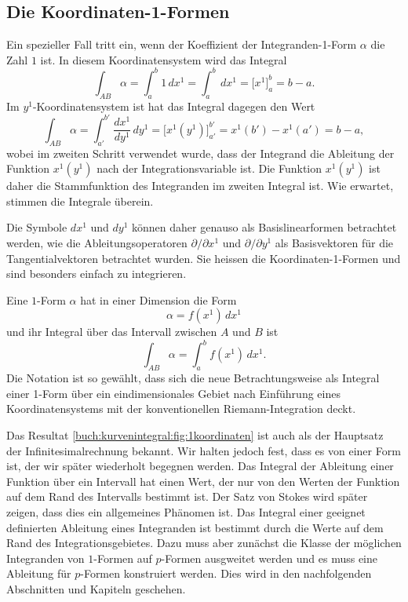 \subsection{Die Koordinaten-1-Formen}
Ein spezieller Fall tritt ein, wenn der Koeffizient der Integranden-1-Form
$\alpha$ die Zahl $1$ ist.
In diesem Koordinatensystem wird das Integral
\[
\int_{AB} \alpha
=
\int_{a}^{b} 1\, dx^1
=
\int_{a}^b\,dx^1
=
\bigl[ x^1 \bigr]_a^b
=
b-a.
\]
Im $y^1$-Koordinatensystem ist hat das Integral dagegen den Wert
\begin{equation}
\int_{AB}\alpha
=
\int_{a'}^{b'} \frac{dx^1}{dy^1}\,dy^1
=
\bigl[x^1(y^1)\bigr]_{a'}^{b'}
=
x^1(b') - x^1(a')
=
b-a,
\label{buch:kurvenintegral:1formen:eqn:hauptsatz}
\end{equation}
wobei im zweiten Schritt verwendet wurde, dass der Integrand die
Ableitung der Funktion $x^1(y^1)$ nach der Integrationsvariable ist.
Die Funktion $x^1(y^1)$ ist daher die
Stammfunktion des Integranden im zweiten Integral ist.
Wie erwartet, stimmen die Integrale überein.

Die Symbole $dx^1$ und $dy^1$ können daher genauso als Basislinearformen
betrachtet werden, wie die Ableitungsoperatoren
$\partial/\partial x^1$ und $\partial/\partial y^1$ als
Basisvektoren für die Tangentialvektoren betrachtet wurden.
Sie heissen die Koordinaten-1-Formen und sind besonders einfach
zu integrieren.

Eine $1$-Form $\alpha$ hat in einer Dimension die Form
\[
\alpha
=
f(x^1) \,dx^1
\]
und ihr Integral über das Intervall zwischen $A$ und $B$ ist
\[
\int_{AB}\alpha
=
\int_a^b f(x^1)\,dx^1.
\]
Die Notation ist so gewählt, dass sich die neue Betrachtungsweise als
Integral einer 1-Form über ein eindimensionales Gebiet nach Einführung
eines Koordinatensystems mit der konventionellen Riemann-Integration
deckt.

Das Resultat
\eqref{buch:kurvenintegral:fig:1koordinaten}
ist auch als der Hauptsatz der Infinitesimalrechnung bekannt.
Wir halten jedoch fest, dass es von einer Form ist, der wir später
wiederholt begegnen werden.
Das Integral der Ableitung einer Funktion über ein Intervall hat einen
Wert, der nur von den Werten der Funktion auf dem Rand des Intervalls
bestimmt ist.
Der Satz von Stokes wird später zeigen, dass dies ein allgemeines
Phänomen ist.
Das Integral einer geeignet definierten Ableitung eines Integranden
ist bestimmt durch die Werte auf dem Rand des Integrationsgebietes.
Dazu muss aber zunächst die Klasse der möglichen Integranden von
$1$-Formen auf $p$-Formen ausgweitet werden und es muss eine Ableitung
für $p$-Formen konstruiert werden.
Dies wird in den nachfolgenden Abschnitten und Kapiteln geschehen.

